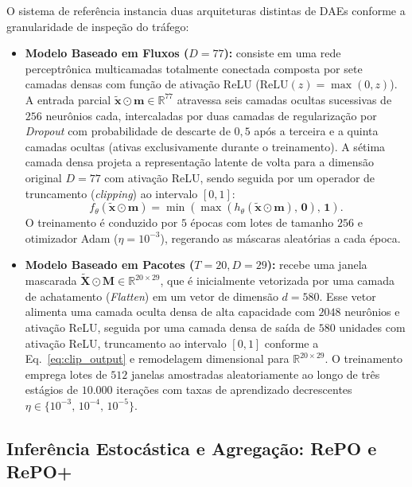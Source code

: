 \documentclass[conference]{IEEEtran}
\begin{document}
O sistema de referência instancia duas arquiteturas distintas de DAEs conforme a granularidade de inspeção do tráfego:
\begin{itemize}
    \item \textbf{Modelo Baseado em Fluxos ($D = 77$):} consiste em uma rede perceptrônica multicamadas totalmente conectada composta por sete camadas densas com função de ativação ReLU ($\text{ReLU}(z) = \max(0, z)$).
    A entrada parcial $\tilde{\mathbf{x}} \odot \mathbf{m} \in \mathbb{R}^{77}$ atravessa seis camadas ocultas sucessivas de $256$ neurônios cada, intercaladas por duas camadas de regularização por \textit{Dropout} com probabilidade de descarte de $0{,}5$ após a terceira e a quinta camadas ocultas (ativas exclusivamente durante o treinamento).
    A sétima camada densa projeta a representação latente de volta para a dimensão original $D = 77$ com ativação ReLU, sendo seguida por um operador de truncamento (\textit{clipping}) ao intervalo $[0, 1]$:
    \begin{equation}
    f_{\theta}(\tilde{\mathbf{x}} \odot \mathbf{m}) = \min\!\left(\max\!\left(h_{\theta}(\tilde{\mathbf{x}} \odot \mathbf{m}),\, \mathbf{0}\right),\, \mathbf{1}\right).
    \label{eq:clip_output}
    \end{equation}
    O treinamento é conduzido por $5$ épocas com lotes de tamanho $256$ e otimizador Adam ($\eta = 10^{-3}$), regerando as máscaras aleatórias a cada época.
    \item \textbf{Modelo Baseado em Pacotes ($T = 20, D = 29$):} recebe uma janela mascarada $\tilde{\mathbf{X}} \odot \mathbf{M} \in \mathbb{R}^{20 \times 29}$, que é inicialmente vetorizada por uma camada de achatamento (\textit{Flatten}) em um vetor de dimensão $d = 580$.
    Esse vetor alimenta uma camada oculta densa de alta capacidade com $2048$ neurônios e ativação ReLU, seguida por uma camada densa de saída de $580$ unidades com ativação ReLU, truncamento ao intervalo $[0, 1]$ conforme a Eq.~\eqref{eq:clip_output} e remodelagem dimensional para $\mathbb{R}^{20 \times 29}$.
    O treinamento emprega lotes de $512$ janelas amostradas aleatoriamente ao longo de três estágios de $10.000$ iterações com taxas de aprendizado decrescentes $\eta \in \{10^{-3},\, 10^{-4},\, 10^{-5}\}$.
\end{itemize}

\subsection{Inferência Estocástica e Agregação: RePO e RePO+}
\end{document}
